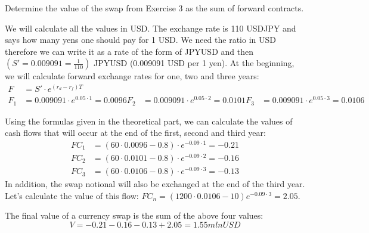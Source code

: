 \documentclass[12pt,a4paper]{exam}
\begin{document}
\begin{questions}
\question Determine the value of the swap from Exercise 3 as the sum of forward contracts.

\begin{solution}
We will calculate all the values in USD. The exchange rate is 110 USDJPY and says how many yens one should pay for 1 USD. We need the ratio in USD therefore we can write it as a rate of the form of JPYUSD and then $(S'=0.009091=\frac{1}{110})$ JPYUSD (0.009091 USD per 1 yen). At the beginning, we will calculate forward exchange rates for one, two and three years:
\begin{equation*}
\begin{aligned}
F&=S'\cdot e^{(r_d-r_f)T}\\
F_1&=0.009091\cdot e^{0.05\cdot 1}=0.0096
F_2&=0.009091\cdot e^{0.05\cdot 2}=0.0101
F_3&=0.009091\cdot e^{0.05\cdot 3}=0.0106
\end{aligned}
\end{equation*}

Using the formulas given in the theoretical part, we can calculate the values of cash flows that will occur at the end of the first, second and third year:
\begin{equation*}
\begin{aligned}
FC_1&=(60\cdot0.0096-0.8)\cdot e^{-0.09\cdot1}=-0.21 \\
FC_2&=(60\cdot0.0101-0.8)\cdot e^{-0.09\cdot2}=-0.16 \\
FC_3&=(60\cdot0.0106-0.8)\cdot e^{-0.09\cdot3}=-0.13
\end{aligned}
\end{equation*}
In addition, the swap notional will also be exchanged at the end of the third year. Let’s calculate the value of this flow: $FC_n=(1200\cdot 0.0106-10)e^{-0.09\cdot3}=2.05$.

The final value of a currency swap is the sum of the above four values:
\begin{equation*}
V=-0.21-0.16-0.13+2.05=1.55 mln USD
\end{equation*}
\end{solution}


\end{questions}
\end{document}
